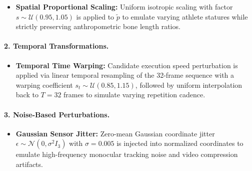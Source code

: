 \documentclass[preprint,12pt]{elsarticle}
\begin{document}
\begin{itemize}
\begin{equation}
    \end{equation}
    Because $R_y(\alpha)$ acts strictly within the transverse plane, vertical displacement remains invariant ($\Delta y' = \Delta y$) and horizontal Euclidean radius is identically preserved:
    \begin{equation}
    \label{eq:yaw_invariance}
        \Delta x'^2 + \Delta z'^2 = (\Delta x \cos\alpha + \Delta z \sin\alpha)^2 + (-\Delta x \sin\alpha + \Delta z \cos\alpha)^2 = \Delta x^2 + \Delta z^2.
    \end{equation}
    Consequently, elevation angles satisfy $\theta' = \theta$, preserving biological limb inclination relative to gravity while teaching the network viewpoint invariance.
    \item \textbf{Spatial Proportional Scaling:} Uniform isotropic scaling with factor $s \sim \mathcal{U}(0.95, 1.05)$ is applied to $\tilde{p}$ to emulate varying athlete statures while strictly preserving anthropometric bone length ratios.
\end{itemize}

\paragraph{2. Temporal Transformations.}
\begin{itemize}
    \item \textbf{Temporal Time Warping:} Candidate execution speed perturbation is applied via linear temporal resampling of the 32-frame sequence with a warping coefficient $s_t \sim \mathcal{U}(0.85, 1.15)$, followed by uniform interpolation back to $T=32$ frames to simulate varying repetition cadence.
\end{itemize}

\paragraph{3. Noise-Based Perturbations.}
\begin{itemize}
    \item \textbf{Gaussian Sensor Jitter:} Zero-mean Gaussian coordinate jitter $\epsilon \sim \mathcal{N}(0, \sigma^2 I_3)$ with $\sigma = 0.005$ is injected into normalized coordinates to emulate high-frequency monocular tracking noise and video compression artifacts.
\end{itemize}
\end{document}
